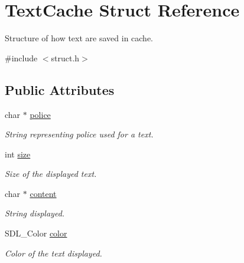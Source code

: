 \hypertarget{struct_text_cache}{}\section{Text\+Cache Struct Reference}
\label{struct_text_cache}


Structure of how text are saved in cache.  




{\ttfamily \#include $<$struct.\+h$>$}

\subsection*{Public Attributes}
\begin{DoxyCompactItemize}
\item 
\mbox{\label{struct_text_cache_ae3b4beef925dedf8dbc778f1e6954936}} 
char $\ast$ \hyperlink{struct_text_cache_ae3b4beef925dedf8dbc778f1e6954936}{police}
\begin{DoxyCompactList}\small\item\em String representing police used for a text. \end{DoxyCompactList}\item 
\mbox{\label{struct_text_cache_a1f435185ba9f58ce1c66545c24d8986d}} 
int \hyperlink{struct_text_cache_a1f435185ba9f58ce1c66545c24d8986d}{size}
\begin{DoxyCompactList}\small\item\em Size of the displayed text. \end{DoxyCompactList}\item 
\mbox{\label{struct_text_cache_aba8c3c28854ab2004e666cb0044d8608}} 
char $\ast$ \hyperlink{struct_text_cache_aba8c3c28854ab2004e666cb0044d8608}{content}
\begin{DoxyCompactList}\small\item\em String displayed. \end{DoxyCompactList}\item 
\mbox{\label{struct_text_cache_adf57a27170aab4f3e85e8379d7740719}} 
S\+D\+L\+\_\+\+Color \hyperlink{struct_text_cache_adf57a27170aab4f3e85e8379d7740719}{color}
\begin{DoxyCompactList}\small\item\em Color of the text displayed. \end{DoxyCompactList}\item 

\end{DoxyCompactItemize}
